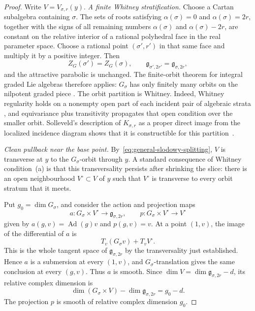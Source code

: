 \documentclass[10pt,a4paper]{amsart}
\begin{document}
\begin{proof}
Write $V=V_{\sigma,r}(y)$.
\smallskip
\noindent\emph{A finite Whitney stratification.}
Choose a Cartan subalgebra containing $\sigma$.  The sets of roots satisfying
$\alpha(\sigma)=0$ and $\alpha(\sigma)=2r$, together with the signs of all
remaining numbers $\alpha(\sigma)$ and $\alpha(\sigma)-2r$, are constant on
the relative interior of a rational polyhedral face in the real parameter
space.  Choose a rational point $(\sigma',r')$ in that same face and multiply
it by a positive integer.  Then
\[
 Z_G(\sigma')=Z_G(\sigma),\qquad
 \mathfrak g_{\sigma',2r'}=\mathfrak g_{\sigma,2r},
\]
and the attractive parabolic is unchanged.  The finite-orbit theorem for
integral graded Lie algebras therefore applies: $G_\sigma$ has only
finitely many orbits on the nilpotent graded piece
\cite[Section~2.1]{LusztigGraded}.  The orbit
partition is Whitney.  Indeed, Whitney regularity holds on a nonempty open
part of each incident pair of algebraic strata
\cite[Lemma~19.3]{Whitney}, and equivariance plus
transitivity propagates that open condition over the smaller orbit.
Solleveld's description of $K_{\sigma,r}$ as a proper direct image from the
localized incidence diagram shows that it is constructible for this
partition~\cite[Section~2.1 and Section~4]{Solleveld}.

\smallskip
\noindent\emph{Clean pullback near the base point.}
By~\eqref{eq:general-slodowy-splitting}, $V$ is transverse at $y$ to the
$G_\sigma$-orbit through $y$.  A standard consequence of Whitney
condition~(a) is that this transversality persists after shrinking the
slice: there is an open neighbourhood $V^\circ\subset V$ of $y$ such that
$V^\circ$ is transverse to every orbit stratum that it meets.

Put $g_0=\dim G_\sigma$, and consider the action and projection maps
\[
 a:G_\sigma\times V^\circ\longrightarrow\mathfrak g_{\sigma,2r},
 \qquad p:G_\sigma\times V^\circ\longrightarrow V^\circ
\]
given by $a(g,v)=\operatorname{Ad}(g)v$ and $p(g,v)=v$.  At a point
$(1,v)$, the image of the differential of $a$ is
\[
 T_v(G_\sigma v)+T_vV^\circ.
\]
This is the whole tangent space of $\mathfrak g_{\sigma,2r}$ by the
transversality just established.  Hence $a$ is a submersion at every
$(1,v)$, and $G_\sigma$-translation gives the same conclusion at every
$(g,v)$.  Thus $a$ is smooth.  Since
$\dim V=\dim\mathfrak g_{\sigma,2r}-d$, its relative complex dimension is
\[
 \dim(G_\sigma\times V)-\dim\mathfrak g_{\sigma,2r}=g_0-d.
\]
The projection $p$ is smooth of relative complex dimension $g_0$.


\end{proof}
\end{document}
